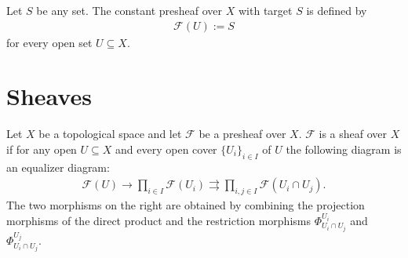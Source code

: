     \begin{example}\label{sheaf:constant_presheaf}
        Let $S$ be any set. The constant presheaf over $X$ with target $S$ is defined by
        \begin{gather}
            \mathcal{F}(U) := S
        \end{gather}
        for every open set $U\subseteq X$.
    \end{example}

\section{Sheaves}

    \begin{property}
        Let $X$ be a topological space and let $\mathcal{F}$ be a presheaf over $X$. $\mathcal{F}$ is a sheaf over $X$ if for any open $U\subseteq X$ and every open cover $\{U_i\}_{i\in I}$ of $U$ the following diagram is an equalizer diagram:
        \begin{gather}
            \mathcal{F}(U)\rightarrow\prod_{i\in I}\mathcal{F}(U_i)\rightrightarrows\prod_{i, j\in I}\mathcal{F}(U_i\cap U_j).
        \end{gather}
        The two morphisms on the right are obtained by combining the projection morphisms of the direct product and the restriction morphisms $\Phi^{U_i}_{U_i\cap U_j}$ and $\Phi^{U_j}_{U_i\cap U_j}$.
    \end{property}

